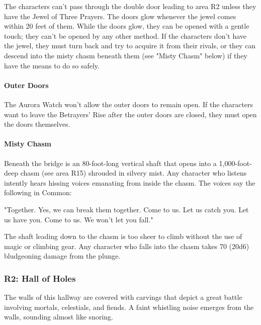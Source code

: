 \documentclass[10pt,a4paper,twoside,twocolumn,openany,nodeprecatedcode]{dndbook}
\begin{document}
The characters can't pass through the double door leading to area R2 unless they have the Jewel of Three Prayers. The doors glow whenever the jewel comes within 20 feet of them. While the doors glow, they can be opened with a gentle touch; they can't be opened by any other method. If the characters don't have the jewel, they must turn back and try to acquire it from their rivals, or they can descend into the misty chasm beneath them (see "Misty Chasm" below) if they have the means to do so safely.

\paragraph{Outer Doors}
The Aurora Watch won't allow the outer doors to remain open. If the characters want to leave the Betrayers' Rise after the outer doors are closed, they must open the doors themselves.

\paragraph{Misty Chasm}
Beneath the bridge is an 80-foot-long vertical shaft that opens into a 1,000-foot-deep chasm (see area R15) shrouded in silvery mist. Any character who listens intently hears hissing voices emanating from inside the chasm. The voices say the following in Common:

\begin{DndReadAloud}{}
"Together. Yes, we can break them together. Come to us. Let us catch you. Let us have you. Come to us. We won't let you fall."

\end{DndReadAloud}

The shaft leading down to the chasm is too sheer to climb without the use of magic or climbing gear. Any character who falls into the chasm takes 70 (20d6) bludgeoning damage from the plunge.

\subsubsection{R2: Hall of Holes}
\begin{DndReadAloud}{}
The walls of this hallway are covered with carvings that depict a great battle involving mortals, celestials, and fiends. A faint whistling noise emerges from the walls, sounding almost like snoring.

\end{DndReadAloud}
\end{document}
